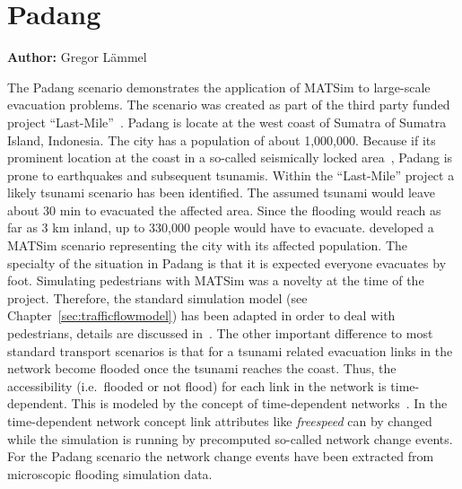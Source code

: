 \section{Padang}
\label{sec:padang}
\hfill \textbf{Author:} Gregor Lämmel

The Padang scenario demonstrates the application of MATSim to large-scale evacuation problems. The scenario was created as part of the third party funded project ``Last-Mile''~\citep{TaubenboeckEtAl2012ConcludingLastMilePaperNatHazards}.
Padang is locate at the west coast of Sumatra of Sumatra Island, Indonesia. The city has a population of about 1,000,000. Because if its prominent location at the coast in a so-called seismically locked area~\citep{McCloskey2010Padang2009Earthquake}, Padang is prone to earthquakes and subsequent tsunamis. Within the ``Last-Mile'' project a likely tsunami scenario has been identified. The assumed tsunami would leave about 30 min to evacuated the affected area. Since the flooding would reach as far as 3 km inland, up to 330,000 people would have to evacuate. \citet{Laemmel_PhDThesis_2011} developed a MATSim scenario representing the city with its affected population. 
The specialty of the situation in Padang is that it is expected everyone evacuates by foot. Simulating pedestrians with MATSim was a novelty at the time of the project. 
Therefore, the standard simulation model (see Chapter~\ref{sec:trafficflowmodel}) has been adapted in order to deal with pedestrians, details are discussed in~\citep{LaemmelKluepfelNagel2009EvacPadangAtBookTimmermanns}. 
The other important difference to most standard transport scenarios is that for a tsunami related evacuation links in the network become flooded once the tsunami reaches the coast. Thus, the accessibility (i.e.~flooded or not flood) for each link in the network is time-dependent. This is modeled by the concept of time-dependent networks~\citep{LaemmelEtAl_TransResC_2010}. In the time-dependent network concept link attributes  like \emph{freespeed} can by changed while the simulation is running by precomputed so-called network change events. For the Padang scenario the network change events have been extracted from microscopic flooding simulation data.

